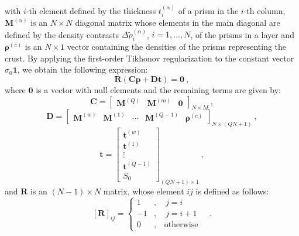 \documentclass[manuscript]{geophysics}
\begin{document}
with $i$-th element defined by the thickness $t^{(\alpha)}_{i}$ of a prism in the
$i$-th column, $\mathbf{M}^{(\alpha)}$ is an $N \times N$ diagonal matrix whose  
elements in the main diagonal are defined by the density contrasts 
$\Delta \tilde{\rho}^{(\alpha)}_{i}$, $i = 1, \dots, N$, of the prisms in a layer and
$\boldsymbol{\rho}^{(c)}$ is an $N \times 1$ vector containing the densities of the prisms
representing the crust. By applying the first-order Tikhonov regularization
\citep{aster-etal2005} to the constant vector $\sigma_{0} \mathbf{1}$, we obtain the
following expression:
\begin{equation}
\mathbf{R} \left( \mathbf{C} \mathbf{p} + \mathbf{D} \mathbf{t} \right) = \mathbf{0} 
\: ,
\label{eq:tik1-lithostatic-stress}
\end{equation}
where $\mathbf{0}$ is a vector with null elements and the remaining terms are given by:
\begin{equation}
\mathbf{C} = \begin{bmatrix}
\mathbf{M}^{(Q)} & \mathbf{M}^{(m)} & \mathbf{0}
\end{bmatrix}_{N \times M} \: ,
\label{eq:matrix-C}
\end{equation}
\begin{equation}
\mathbf{D} = \begin{bmatrix}
\mathbf{M}^{(w)} & \mathbf{M}^{(1)} & \cdots & \mathbf{M}^{(Q-1)} &
\boldsymbol{\rho}^{(c)}
\end{bmatrix}_{N \times \left( QN + 1 \right)} \: ,
\label{eq:matrix-D}
\end{equation}
\begin{equation}
\mathbf{t} = \begin{bmatrix}
\mathbf{t}^{(w)} \\ \mathbf{t}^{(1)} \\ \vdots \\ \mathbf{t}^{(Q-1)} \\ S_{0}
\end{bmatrix}_{\left( QN + 1 \right) \times 1}\: ,
\label{eq:vector-t}
\end{equation}
and $\mathbf{R}$ is an $\left( N-1 \right) \times N$ matrix, whose element 
$ij$ is defined as follows:
\begin{equation}
\left[ \mathbf{R} \right]_{ij} = \begin{cases}
1 &, \quad j = i \\
-1 &, \quad j = i + 1 \\
0 &, \quad \text{otherwise}
\end{cases} \quad .
\label{eq:matrix-R}
\end{equation}
\end{document}
